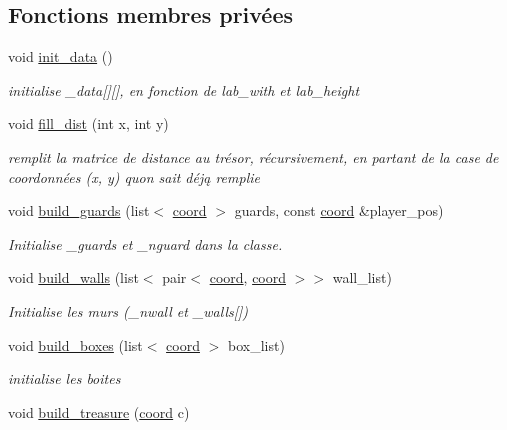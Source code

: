 \subsection*{Fonctions membres privées}
\begin{DoxyCompactItemize}
\item 
void \hyperlink{classLabyrinthe_afc3f86c4ce00a37bd2b033d1e343c7c5}{init\+\_\+data} ()
\begin{DoxyCompactList}\small\item\em initialise \+\_\+data\mbox{[}\mbox{]}\mbox{[}\mbox{]}, en fonction de lab\+\_\+with et lab\+\_\+height \end{DoxyCompactList}\item 
void \hyperlink{classLabyrinthe_ac465d56c311759a7f55a54da90329e17}{fill\+\_\+dist} (int x, int y)
\begin{DoxyCompactList}\small\item\em remplit la matrice de distance au trésor, récursivement, en partant de la case de coordonnées (x, y) qu\textquotesingle{}on sait déją remplie \end{DoxyCompactList}\item 
void \hyperlink{classLabyrinthe_a3fc2a0b2bbf0d1101fd7a3804bda9584}{build\+\_\+guards} (list$<$ \hyperlink{structcoord}{coord} $>$ guards, const \hyperlink{structcoord}{coord} \&player\+\_\+pos)
\begin{DoxyCompactList}\small\item\em Initialise \+\_\+guards et \+\_\+nguard dans la classe. \end{DoxyCompactList}\item 
void \hyperlink{classLabyrinthe_a2694b6ca24a8bba34f590d645245ff7e}{build\+\_\+walls} (list$<$ pair$<$ \hyperlink{structcoord}{coord}, \hyperlink{structcoord}{coord} $>$$>$ wall\+\_\+list)
\begin{DoxyCompactList}\small\item\em Initialise les murs (\+\_\+nwall et \+\_\+walls\mbox{[}\mbox{]}) \end{DoxyCompactList}\item 
void \hyperlink{classLabyrinthe_a69718b426a9402cd578b2174d3b9389b}{build\+\_\+boxes} (list$<$ \hyperlink{structcoord}{coord} $>$ box\+\_\+list)
\begin{DoxyCompactList}\small\item\em initialise les boites \end{DoxyCompactList}\item 
void \hyperlink{classLabyrinthe_a2e30105a06c0512ea2078f825fae17bd}{build\+\_\+treasure} (\hyperlink{structcoord}{coord} c)
$$
\end{DoxyCompactItemize}
